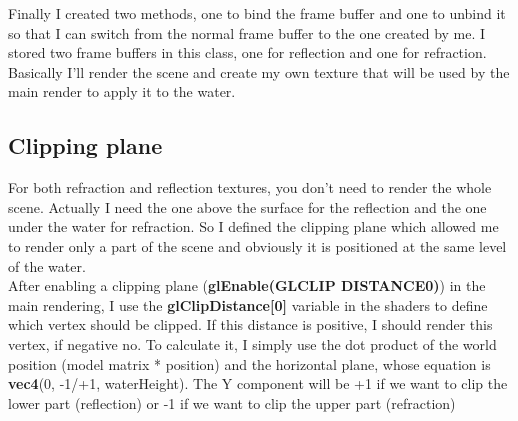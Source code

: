 \noindent
Finally I created two methods, one to bind the frame buffer and one to unbind it so that I can switch from the normal frame buffer to the one created by me. I stored two frame buffers in this class, one for reflection and one for refraction. Basically I'll render the scene and create my own texture that will be used by the main render to apply it to the water.

\subsection{Clipping plane}
For both refraction and reflection textures, you don't need to render the whole scene. Actually I need the one above the surface for the reflection and the one under the water for refraction. So I defined the clipping plane which allowed me to render only a part of the scene and obviously it is positioned at the same level of the water. \\
After enabling a clipping plane (\textbf{glEnable(GL\textunderscore CLIP \textunderscore DISTANCE0)}) in the main rendering, I use the \textbf{gl\textunderscore ClipDistance[0]} variable in the shaders to define which vertex should be clipped. If this distance is positive, I should render this vertex, if negative no. To calculate it, I simply use the dot product of the world position (model matrix * position) and the horizontal plane, whose equation is \textbf{vec4}(0, -1/+1, waterHeight). The Y component will be +1 if we want to clip the lower part (reflection) or -1 if we want to clip the upper part (refraction)

\newpage

\begin{figure}[hbt!]
	\centering
	\qquad
	\caption{}
\end{figure}

